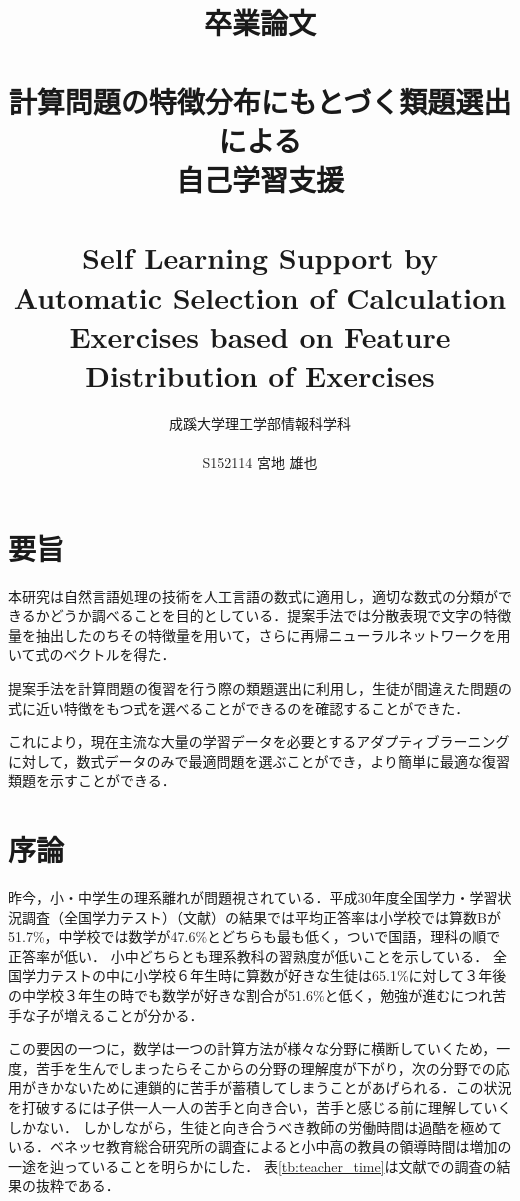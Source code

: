 \documentclass[a4j,11pt,report]{jsbook}
\title{卒業論文\\　\vspace{3em}\\{\huge #1}\\　\\#2\vspace{15em}}%
\author{{\huge 成蹊大学理工学部情報科学科}\\　\\{\huge #3}}%
\date{}
\newcommand{\frontpage}[3]{%
\title{卒業論文\\　\vspace{3em}\\{\huge #1}\\　\\#2\vspace{15em}}%
\author{{\huge 成蹊大学理工学部情報科学科}\\　\\{\huge #3}}%
\date{}
\maketitle

\thispagestyle{empty}


}
\begin{document}
\frontpage  %
{計算問題の特徴分布にもとづく類題選出による\\自己学習支援}
{Self Learning Support by Automatic Selection of Calculation Exercises based on Feature Distribution of Exercises}
{S152114 宮地 雄也}



\chapter*{要旨}
\thispagestyle{empty}

本研究は自然言語処理の技術を人工言語の数式に適用し，適切な数式の分類ができるかどうか調べることを目的としている．提案手法では分散表現で文字の特徴量を抽出したのちその特徴量を用いて，さらに再帰ニューラルネットワークを用いて式のベクトルを得た．

提案手法を計算問題の復習を行う際の類題選出に利用し，生徒が間違えた問題の式に近い特徴をもつ式を選べることができるのを確認することができた．

これにより，現在主流な大量の学習データを必要とするアダプティブラーニングに対して，数式データのみで最適問題を選ぶことができ，より簡単に最適な復習類題を示すことができる．


\tableofcontents
\thispagestyle{empty}

\thispagestyle{plain}
\setcounter{page}{1}

\chapter{序論 \label{ch:introduction}}

昨今，小・中学生の理系離れが問題視されている．平成30年度全国学力・学習状況調査（全国学力テスト）（文献\cite{result_zennkoku_test}）の結果では平均正答率は小学校では算数Bが51.7\%，中学校では数学が47.6\%とどちらも最も低く，ついで国語，理科の順で正答率が低い．
小中どちらとも理系教科の習熟度が低いことを示している．
全国学力テストの中に小学校６年生時に算数が好きな生徒は65.1\%に対して３年後の中学校３年生の時でも数学が好きな割合が51.6\%と低く，勉強が進むにつれ苦手な子が増えることが分かる．

この要因の一つに，数学は一つの計算方法が様々な分野に横断していくため，一度，苦手を生んでしまったらそこからの分野の理解度が下がり，次の分野での応用がきかないために連鎖的に苦手が蓄積してしまうことがあげられる．この状況を打破するには子供一人一人の苦手と向き合い，苦手と感じる前に理解していくしかない．
しかしながら，生徒と向き合うべき教師の労働時間は過酷を極めている．ベネッセ教育総合研究所の調査によると小中高の教員の領導時間は増加の一途を辿っていることを明らかにした．
表\ref{tb:teacher_time}は文献\cite{benesse_DateBook}での調査の結果の抜粋である．
\end{document}
